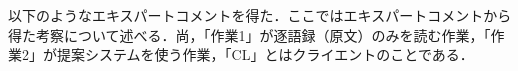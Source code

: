 \documentclass[shuuron]{kuee}
\begin{document}
以下のようなエキスパートコメントを得た．ここではエキスパートコメントから得た考察について述べる．尚，「作業1」が逐語録（原文）のみを読む作業，「作業2」が提案システムを使う作業，「CL」とはクライエントのことである．
%
%
\end{document}
